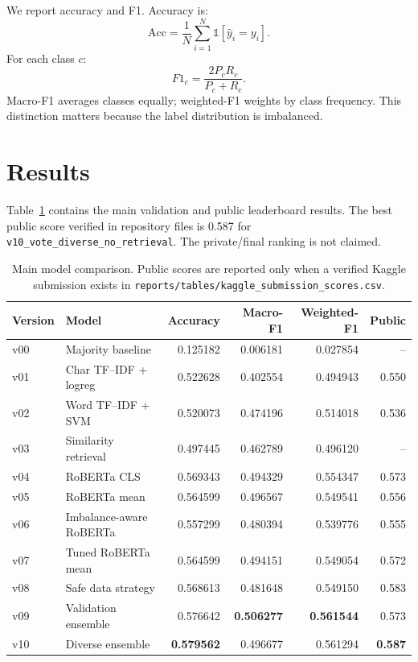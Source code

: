 \documentclass[10pt,a4paper,twocolumn]{article}
\begin{document}
We report accuracy and F1. Accuracy is:
\begin{equation}
\mathrm{Acc}=\frac{1}{N}\sum_{i=1}^{N}\mathbb{1}[\hat{y}_i=y_i].
\end{equation}
For each class \(c\):
\begin{equation}
F1_c = \frac{2P_cR_c}{P_c+R_c}.
\end{equation}
Macro-F1 averages classes equally; weighted-F1 weights by class frequency. This distinction matters because the label distribution is imbalanced.

\section{Results}

Table~\ref{tab:results} contains the main validation and public leaderboard results. The best public score verified in repository files is 0.587 for \texttt{v10\_vote\_diverse\_no\_retrieval}. The private/final ranking is not claimed.

\begin{table}[t]
\centering
\caption{Main model comparison. Public scores are reported only when a verified Kaggle submission exists in \texttt{reports/tables/kaggle\_submission\_scores.csv}.}
\label{tab:results}
\begin{tabular}{llrrrr}
\toprule
Version & Model & Accuracy & Macro-F1 & Weighted-F1 & Public \\
\midrule
v00 & Majority baseline & 0.125182 & 0.006181 & 0.027854 & -- \\
v01 & Char TF--IDF + logreg & 0.522628 & 0.402554 & 0.494943 & 0.550 \\
v02 & Word TF--IDF + SVM & 0.520073 & 0.474196 & 0.514018 & 0.536 \\
v03 & Similarity retrieval & 0.497445 & 0.462789 & 0.496120 & -- \\
v04 & RoBERTa CLS & 0.569343 & 0.494329 & 0.554347 & 0.573 \\
v05 & RoBERTa mean & 0.564599 & 0.496567 & 0.549541 & 0.556 \\
v06 & Imbalance-aware RoBERTa & 0.557299 & 0.480394 & 0.539776 & 0.555 \\
v07 & Tuned RoBERTa mean & 0.564599 & 0.494151 & 0.549054 & 0.572 \\
v08 & Safe data strategy & 0.568613 & 0.481648 & 0.549150 & 0.583 \\
v09 & Validation ensemble & 0.576642 & \textbf{0.506277} & \textbf{0.561544} & 0.573 \\
v10 & Diverse ensemble & \textbf{0.579562} & 0.496677 & 0.561294 & \textbf{0.587} \\
\bottomrule
\end{tabular}
\end{table}
\end{document}
